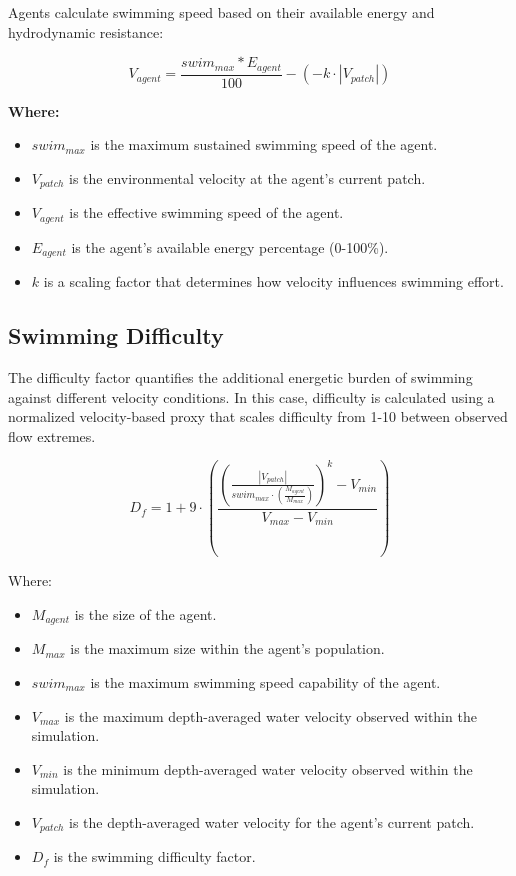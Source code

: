 \documentclass[
]{book}
\providecommand{\tightlist}{%
  \setlength{\itemsep}{0pt}\setlength{\parskip}{0pt}}
\begin{document}
Agents calculate swimming speed based on their available energy and hydrodynamic resistance:

\[ V_{agent} = \frac{swim_{max} * E_{agent}}{100} - (-k \cdot |V_{patch}|) \]

\textbf{Where:}

\begin{itemize}
\item
  \(swim_{max}\) is the maximum sustained swimming speed of the agent.
\item
  \(V_{patch}\) is the environmental velocity at the agent's current patch.
\item
  \(V_{agent}\) is the effective swimming speed of the agent.
\item
  \(E_{agent}\) is the agent's available energy percentage (0-100\%).
\item
  \(k\) is a scaling factor that determines how velocity influences swimming effort.
\end{itemize}

\subsection{\texorpdfstring{\textbf{Swimming Difficulty}}{Swimming Difficulty}}\label{swimming-difficulty}

The difficulty factor quantifies the additional energetic burden of swimming against different velocity conditions. In this case, difficulty is calculated using a normalized velocity-based proxy that scales difficulty from 1-10 between observed flow extremes.

\[D_{f} = 1 + 9 \cdot \left(\frac{\left( \frac{|V_{patch}|}{swim_{max} \cdot \left(\frac{M_{agent}}{M_{max}}\right)} \right)^k - V_{min}}{V_{max} - V_{min}}\right)\]

Where:

\begin{itemize}
\tightlist
\item
  \(M_{agent}\) is the size of the agent.
\item
  \(M_{max}\) is the maximum size within the agent's population.
\item
  \(swim_{max}\) is the maximum swimming speed capability of the agent.
\item
  \(V_{max}\) is the maximum depth-averaged water velocity observed within the simulation.
\item
  \(V_{min}\) is the minimum depth-averaged water velocity observed within the simulation.
\item
  \(V_{patch}\) is the depth-averaged water velocity for the agent's current patch.
\item
  \(D_{f}\) is the swimming difficulty factor.
\end{itemize}
\end{document}
